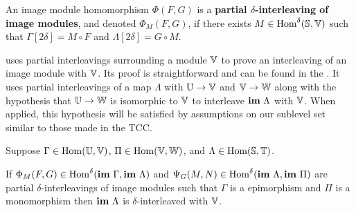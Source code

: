 \begin{definition}
  An image module homomorphism $\Phi(F, G)$ is a \textbf{partial $\delta$-interleaving of image modules}, and denoted $\Phi_M(F, G)$, if there exists $M\in\mathrm{Hom}^\delta(\mathbb{S},\mathbb{V})$ such that $\Gamma[2\delta] = M\circ F$ and $\Lambda[2\delta] = G\circ M$.
\end{definition}



uses partial interleavings surrounding a module $\mathbb{V}$ to prove an interleaving of an image module with $\mathbb{V}$.
Its proof is straightforward and can be found in the \fullversion.
It uses partial interleavings of a map $\Lambda$ with $\mathbb{U}\to\mathbb{V}$ and $\mathbb{V}\to\mathbb{W}$ along with the hypothesis that $\mathbb{U}\to \mathbb{W}$ is isomorphic to $\mathbb{V}$ to interleave $\mathbf{im}~\Lambda$ with $\mathbb{V}$.
When applied, this hypothesis will be satisfied by assumptions on our sublevel set similar to those made in the TCC.

\begin{lemma}\label{thm:interleaving_main}
  Suppose $\Gamma\in\mathrm{Hom}(\mathbb{U},\mathbb{V})$, $\Pi\in\mathrm{Hom}(\mathbb{V},\mathbb{W})$, and $\Lambda\in\mathrm{Hom}(\mathbb{S}, \mathbb{T})$.

  If $\Phi_M(F, G)\in\mathrm{Hom}^\delta(\mathbf{im}~\Gamma, \mathbf{im}~\Lambda)$ and $\Psi_G(M, N)\in\mathrm{Hom}^\delta(\mathbf{im}~\Lambda, \mathbf{im}~\Pi)$ are partial $\delta$-interleavings of image modules such that $\Gamma$ is a epimorphism and $\Pi$ is a monomorphism then $\mathbf{im}~\Lambda$ is $\delta$-interleaved with $\mathbb{V}$.
\end{lemma}

